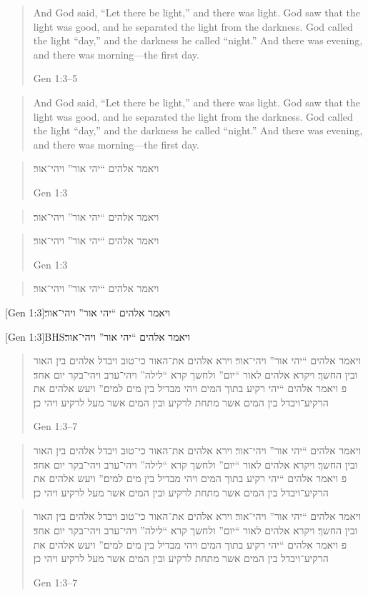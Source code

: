 \documentclass[12pt]{article}
\begin{document}
\blockquote[Gen 1:3–5]{And God said, \enquote{Let there be light,} and there
was light. God saw that the light was good, and he separated the light from
the darkness. God called the light \enquote{day,} and the darkness he called
\enquote{night.} And there was evening, and there was morning—the first day.}

\blockcquote[Gen 1:3–5]{BHS}{And God said, \enquote{Let there be light,} and
there was light. God saw that the light was good, and he separated the light
from the darkness. God called the light \enquote{day,} and the darkness he
called \enquote{night.} And there was evening, and there was morning—the first
day.}

\foreignblockquote{hebrew}[Gen 1:3]{ויאמר אלהים \enquote{יהי אור} ויהי־אור׃}

\foreignblockcquote{hebrew}[Gen 1:3]{BHS}{ויאמר אלהים \enquote{יהי אור}
ויהי־אור׃}

\hyphenblockquote{hebrew}[Gen 1:3]{ויאמר אלהים \enquote{יהי אור} ויהי־אור׃}

\hyphenblockcquote{hebrew}[Gen 1:3]{BHS}{ויאמר אלהים \enquote{יהי אור}
ויהי־אור׃}

[Gen 1:3]{ויאמר אלהים \enquote{יהי אור} ויהי־אור׃}

[Gen 1:3]{BHS}{ויאמר אלהים \enquote{יהי אור}
ויהי־אור׃}

\foreignblockquote{hebrew}[Gen 1:3–7]{ויאמר אלהים \enquote{יהי אור} ויהי־אור׃
וירא אלהים את־האור כי־טוב ויבדל אלהים בין האור ובין החשך׃ ויקרא אלהים לאור
\enquote{יום} ולחשך קרא \enquote{לילה} ויהי־ערב ויהי־בקר יום אחד׃ פ ויאמר
אלהים \enquote{יהי רקיע בתוך המים ויהי מבדיל בין מים למים׃} ויעש אלהים את
הרקיע־ויבדל בין המים אשר מתחת לרקיע ובין המים אשר מעל לרקיע ויהי כן׃}

\foreignblockcquote{hebrew}[Gen 1:3–7]{BHS}{ויאמר אלהים \enquote{יהי אור}
ויהי־אור׃ וירא אלהים את־האור כי־טוב ויבדל אלהים בין האור ובין החשך׃ ויקרא
אלהים לאור \enquote{יום} ולחשך קרא \enquote{לילה} ויהי־ערב ויהי־בקר יום אחד׃ פ
ויאמר אלהים \enquote{יהי רקיע בתוך המים ויהי מבדיל בין מים למים׃} ויעש אלהים
את הרקיע־ויבדל בין המים אשר מתחת לרקיע ובין המים אשר מעל לרקיע ויהי כן׃}

\hyphenblockquote{hebrew}[Gen 1:3–7]{ויאמר אלהים \enquote{יהי אור} ויהי־אור׃
וירא אלהים את־האור כי־טוב ויבדל אלהים בין האור ובין החשך׃ ויקרא אלהים לאור
\enquote{יום} ולחשך קרא \enquote{לילה} ויהי־ערב ויהי־בקר יום אחד׃ פ ויאמר
אלהים \enquote{יהי רקיע בתוך המים ויהי מבדיל בין מים למים׃} ויעש אלהים את
הרקיע־ויבדל בין המים אשר מתחת לרקיע ובין המים אשר מעל לרקיע ויהי כן׃}
\end{document}
